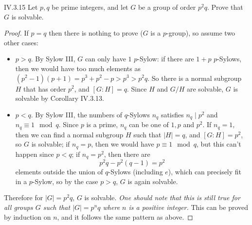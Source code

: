 \begin{problem}{IV.3.15}
Let $p,q$ be prime integers, and let $G$ be a group of order $p^2q$. Prove that $G$ is solvable.
\end{problem}
\begin{proof}
If $p = q$ then there is nothing to prove ($G$ is a $p$-group), so assume two other cases:
\begin{itemize}
\setlength\itemsep{0pt}
\item $p > q$. By Sylow III, $G$ can only have $1$ $p$-Sylow: if there are $1+p$ $p$-Sylows, then we would have too much elements as $(p^2-1)(p+1) = p^3 + p^2 - p > p^3 > p^2q$. So there is a normal subgroup $H$ that has order $p^2$, and $[G:H] = q$. Since $H$ and $G/H$ are solvable, $G$ is solvable by Corollary IV.3.13.
\item $p < q$. By Sylow III, the numbers of $q$-Sylows $n_q$ satisfies $n_q \mid p^2$ and $n_q \equiv 1 \mod q$. Since $p$ is a prime, $n_q$ can be one of $1, p$ and $p^2$. If $n_q = 1$, then we can find a normal subgroup $H$ such that $|H|=q$, and $[G:H]=p^2$, so $G$ is solvable; if $n_q = p$, then we would have $p \equiv 1 \mod q$, but this can't happen since $p < q$; if $n_q = p^2$, then there are 
\[
p^2q - p^2(q-1) = p^2 
\]
elements outside the union of $q$-Sylows (including $e$), which can precisely fit in a $p$-Sylow, so by the case $p>q$, $G$ is again solvable. 
\end{itemize}
Therefore for $|G|=p^2q$, $G$ is solvable. \emph{One should note that this is still true for all groups $G$ such that $|G|=p^nq$ where $n$ is a positive integer.} This can be proved by induction on $n$, and it follows the same pattern as above. 
\end{proof}

